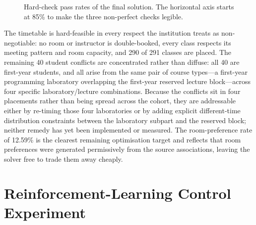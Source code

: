 \documentclass[journal]{IEEEtran}
\begin{document}
\begin{figure}[t]
\centering
{}
\caption{Hard-check pass rates of the final solution. The horizontal axis starts at 85\% to make the three non-perfect checks legible.}
\label{fig:hardchecks}
\end{figure}

The timetable is hard-feasible in every respect the institution treats as non-negotiable: no room or instructor is double-booked, every class respects its meeting pattern and room capacity, and 290 of 291 classes are placed. The remaining 40 student conflicts are concentrated rather than diffuse: all 40 are first-year students, and all arise from the same pair of course types---a first-year programming laboratory overlapping the first-year reserved lecture block---across four specific laboratory/lecture combinations. Because the conflicts sit in four placements rather than being spread across the cohort, they are addressable either by re-timing those four laboratories or by adding explicit different-time distribution constraints between the laboratory subpart and the reserved block; neither remedy has yet been implemented or measured. The room-preference rate of 12.59\% is the clearest remaining optimisation target and reflects that room preferences were generated permissively from the source associations, leaving the solver free to trade them away cheaply.

\section{Reinforcement-Learning Control Experiment}
\label{sec:rl}
\end{document}
